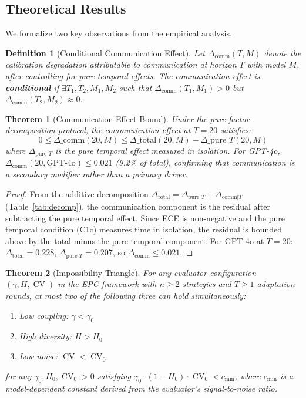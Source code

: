 \documentclass[11pt]{article}
\DeclareMathOperator{\CV}{CV}
\newtheorem{definition}{Definition}
\newtheorem{theorem}{Theorem}
\begin{document}
\subsection{Theoretical Results}

We formalize two key observations from the empirical analysis.

\begin{definition}[Conditional Communication Effect]
Let $\Delta_{\text{comm}}(T, M)$ denote the calibration degradation attributable to communication at horizon $T$ with model $M$, after controlling for pure temporal effects. The communication effect is \textbf{conditional} if $\exists T_1, T_2, M_1, M_2$ such that $\Delta_{\text{comm}}(T_1, M_1) > 0$ but $\Delta_{\text{comm}}(T_2, M_2) \approx 0$.
\end{definition}

\begin{theorem}[Communication Effect Bound]
\label{thm:comm-bound}
Under the pure-factor decomposition protocol, the communication effect at $T{=}20$ satisfies:
\begin{equation}
    0 \leq \Delta\_{\text{comm}}(20, M) \leq \Delta\_{\text{total}}(20, M) - \Delta\_{\text{pure } T}(20, M)
\end{equation}
where $\Delta_{\text{pure } T}$ is the pure temporal effect measured in isolation. For GPT-4o, $\Delta_{\text{comm}}(20, \text{GPT-4o}) \leq 0.021$ (9.2\% of total), confirming that communication is a secondary modifier rather than a primary driver.
\end{theorem}

\begin{proof}
From the additive decomposition $\Delta_{\text{total}} = \Delta_{\text{pure } T} + \Delta_{\text{comm}|T}$ (Table~\ref{tab:decomp}), the communication component is the residual after subtracting the pure temporal effect. Since ECE is non-negative and the pure temporal condition (C1c) measures time in isolation, the residual is bounded above by the total minus the pure temporal component. For GPT-4o at $T{=}20$: $\Delta_{\text{total}}{=}0.228$, $\Delta_{\text{pure } T}{=}0.207$, so $\Delta_{\text{comm}} \leq 0.021$.
\end{proof}

\begin{theorem}[Impossibility Triangle]
\label{thm:triangle}
For any evaluator configuration $(\gamma, H, \CV)$ in the EPC framework with $n \geq 2$ strategies and $T \geq 1$ adaptation rounds, at most two of the following three can hold simultaneously:
\begin{enumerate}[leftmargin=*,nosep]
    \item Low coupling: $\gamma < \gamma_0$
    \item High diversity: $H > H_0$
    \item Low noise: $\CV < \CV_0$
\end{enumerate}
for any $\gamma_0, H_0, \CV_0 > 0$ satisfying $\gamma_0 \cdot (1 - H_0) \cdot \CV_0 < c_{\min}$, where $c_{\min}$ is a model-dependent constant derived from the evaluator's signal-to-noise ratio.
\end{theorem}
\end{document}
